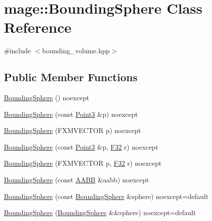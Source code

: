 \hypertarget{classmage_1_1_bounding_sphere}{}\section{mage\+:\+:Bounding\+Sphere Class Reference}
\label{classmage_1_1_bounding_sphere}


{\ttfamily \#include $<$bounding\+\_\+volume.\+hpp$>$}

\subsection*{Public Member Functions}
\begin{DoxyCompactItemize}
\item 
\mbox{\hyperlink{classmage_1_1_bounding_sphere_a3bf22ae012630101af6578173958aebc}{Bounding\+Sphere}} () noexcept
\item 
\mbox{\hyperlink{classmage_1_1_bounding_sphere_a8f70fd7013b1d2a22545ab659847840f}{Bounding\+Sphere}} (const \mbox{\hyperlink{structmage_1_1_point3}{Point3}} \&p) noexcept
\item 
\mbox{\hyperlink{classmage_1_1_bounding_sphere_a6117f902c00f9ef11633274fca43430f}{Bounding\+Sphere}} (F\+X\+M\+V\+E\+C\+T\+OR p) noexcept
\item 
\mbox{\hyperlink{classmage_1_1_bounding_sphere_a6ac68183ac535e65e49d47c0f2510f9b}{Bounding\+Sphere}} (const \mbox{\hyperlink{structmage_1_1_point3}{Point3}} \&p, \mbox{\hyperlink{namespacemage_aa97e833b45f06d60a0a9c4fc22ae02c0}{F32}} r) noexcept
\item 
\mbox{\hyperlink{classmage_1_1_bounding_sphere_a073f00e18116d12e760f1b1e5a58c3cb}{Bounding\+Sphere}} (F\+X\+M\+V\+E\+C\+T\+OR p, \mbox{\hyperlink{namespacemage_aa97e833b45f06d60a0a9c4fc22ae02c0}{F32}} r) noexcept
\item 
\mbox{\hyperlink{classmage_1_1_bounding_sphere_a78a89519a72bdb06feb4850e5209bc06}{Bounding\+Sphere}} (const \mbox{\hyperlink{classmage_1_1_a_a_b_b}{A\+A\+BB}} \&aabb) noexcept
\item 
\mbox{\hyperlink{classmage_1_1_bounding_sphere_aadd1c7613e09ad807d8a877c8b0906ac}{Bounding\+Sphere}} (const \mbox{\hyperlink{classmage_1_1_bounding_sphere}{Bounding\+Sphere}} \&sphere) noexcept=default
\item 
\mbox{\hyperlink{classmage_1_1_bounding_sphere_a566985b59dd05cc4545c41183338a275}{Bounding\+Sphere}} (\mbox{\hyperlink{classmage_1_1_bounding_sphere}{Bounding\+Sphere}} \&\&sphere) noexcept=default
\item 

\end{DoxyCompactItemize}
